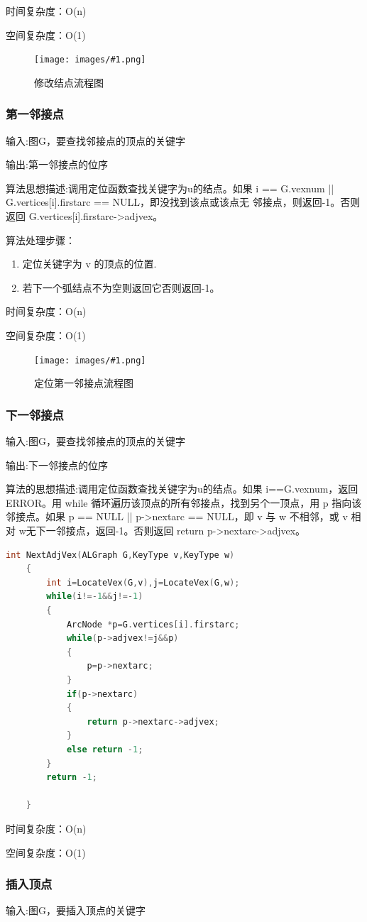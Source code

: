 \documentclass[supercite]{Experimental_Report}
\newcommand{\cfig}[3]{
	\begin{figure}[htb]
		\centering
		\texttt{[image: images/\#1.png]}
		\caption{#3}
		\label{fig:#1}
	\end{figure}
}
\theoremstyle{definition}
\begin{document}
时间复杂度：O(n)

空间复杂度：O(1)
\cfig{2.3.3}{0.8}{修改结点流程图}
\subsubsection{第一邻接点}

输入:图G，要查找邻接点的顶点的关键字

输出:第一邻接点的位序

算法思想描述:调用定位函数查找关键字为u的结点。如果 i == G.vexnum || G.vertices[i].firstarc == NULL，即没找到该点或该点无
邻接点，则返回-1。否则返回 G.vertices[i].firstarc->adjvex。

算法处理步骤：
\begin{enumerate}
	\renewcommand{\labelenumi}{\theenumi)}
	\item 定位关键字为 v 的顶点的位置.
	\item 若下一个弧结点不为空则返回它否则返回-1。
\end{enumerate}

时间复杂度：O(n)

空间复杂度：O(1)
\cfig{2.3.4}{0.8}{定位第一邻接点流程图}
\subsubsection{下一邻接点}
输入:图G，要查找邻接点的顶点的关键字

输出:下一邻接点的位序

算法的思想描述:调用定位函数查找关键字为u的结点。如果 i==G.vexnum，返回ERROR。用 while 循环遍历该顶点的所有邻接点，找到另个一顶点，用 p 指向该邻接点。如果 p == NULL || p->nextarc == NULL，即 v 与 w 不相邻，或 v 相对 w无下一邻接点，返回-1。否则返回 return p->nextarc->adjvex。

\begin{lstlisting}[language=C] 
	int NextAdjVex(ALGraph G,KeyType v,KeyType w)
	{
		int i=LocateVex(G,v),j=LocateVex(G,w);
		while(i!=-1&&j!=-1)
		{
			ArcNode *p=G.vertices[i].firstarc;
			while(p->adjvex!=j&&p)
			{
				p=p->nextarc;
			}
			if(p->nextarc)
			{
				return p->nextarc->adjvex;
			}
			else return -1;
		}
		return -1;
	
	}
\end{lstlisting}

时间复杂度：O(n)

空间复杂度：O(1)
\subsubsection{插入顶点}
输入:图G，要插入顶点的关键字
\end{document}
